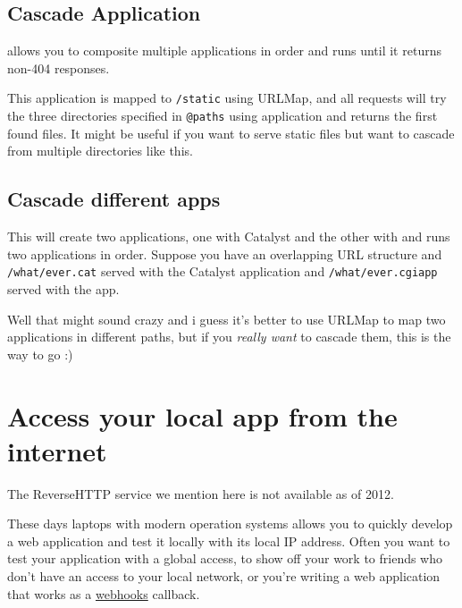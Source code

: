\section{Cascade Application}\label{cascade-application}

 allows you to composite multiple applications in
order and runs until it returns non-404 responses.


This application is mapped to \lstinline!/static! using URLMap, and all
requests will try the three directories specified in \lstinline!@paths!
using  application and returns the first found files. It might
be useful if you want to serve static files but want to cascade from
multiple directories like this.

\section{Cascade different apps}\label{cascade-different-apps}


This will create two applications, one with Catalyst and the other with
 and runs two applications in order. Suppose you have an
overlapping URL structure and \lstinline!/what/ever.cat! served with the
Catalyst application and \lstinline!/what/ever.cgiapp! served with the
 app.

Well that might sound crazy and i guess it's better to use URLMap to map
two applications in different paths, but if you \emph{really want} to
cascade them, this is the way to go :)

\chapter{Access your local app from the
internet}\label{day-20-access-your-local-app-from-the-internet}

\begin{note}
  The ReverseHTTP service we mention here is not available as of 2012.
\end{note}

These days laptops with modern operation systems allows you to quickly
develop a web application and test it locally with its local IP address.
Often you want to test your application with a global access, to show
off your work to friends who don't have an access to your local network,
or you're writing a web application that works as a
\href{http://www.webhooks.org/}{webhooks} callback.

